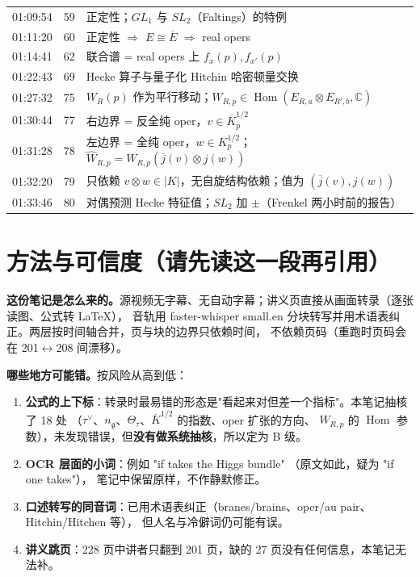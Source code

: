 \documentclass[11pt,a4paper]{ctexart}
\newcommand{\Hom}{\operatorname{Hom}}
\begin{document}
\begin{center}
\begin{tabular}{@{}llp{9.6cm}@{}}
01:09:54 & 59 & 正定性；$GL_1$ 与 $SL_2$（Faltings）的特例\\
01:11:20 & 60 & 正定性 $\Rightarrow$ $E\cong\overline{E}$ $\Rightarrow$ real opers\\
01:14:41 & 62 & 联合谱 = real opers 上 $f_x(p),f_{x'}(p)$\\
01:22:43 & 69 & Hecke 算子与量子化 Hitchin 哈密顿量交换\\
01:27:32 & 75 & $W_R(p)$ 作为平行移动；$W_{R,p}\in\Hom(E_{R,a}\otimes E_{R',b},\mathbb{C})$\\
01:30:44 & 77 & 右边界 = 反全纯 oper，$v\in\overline{K}^{1/2}_p$\\
01:31:28 & 78 & 左边界 = 全纯 oper，$w\in K^{1/2}_p$；$\widehat{W}_{R,p}=W_{R,p}(\overline{j}(v)\otimes j(w))$\\
01:32:20 & 79 & 只依赖 $v\otimes w\in|K|$，无自旋结构依赖；值为 $(\overline{j}(v),j(w))$\\
01:33:46 & 80 & 对偶预测 Hecke 特征值；$SL_2$ 加 $\pm$（Frenkel 两小时前的报告）\\
\bottomrule
\end{tabular}
\end{center}

\section{方法与可信度（请先读这一段再引用）}

\textbf{这份笔记是怎么来的。}源视频无字幕、无自动字幕；讲义页直接从画面转录（逐张读图、公式转 LaTeX），
音轨用 faster-whisper small.en 分块转写并用术语表纠正。两层按时间轴合并，页与块的边界只依赖时间，
不依赖页码（重跑时页码会在 201$\leftrightarrow$208 间漂移）。

\textbf{哪些地方可能错。}按风险从高到低：
\begin{enumerate}[label=\arabic*.]
\item \textbf{公式的上下标}：转录时最易错的形态是"看起来对但差一个指标"。本笔记抽核了 18 处
（$\tau^{\vee}$、$n_{\mathfrak{g}}$、$\Theta_\tau$、$\overline{K}^{1/2}$ 的指数、oper 扩张的方向、
$W_{R,p}$ 的 $\Hom$ 参数），未发现错误，但\textbf{没有做系统抽核}，所以定为 B 级。
\item \textbf{OCR 层面的小词}：例如 "if takes the Higgs bundle" （原文如此，疑为 "if one takes"），
笔记中保留原样，不作静默修正。
\item \textbf{口述转写的同音词}：已用术语表纠正（branes/brains、oper/au pair、Hitchin/Hitchen 等），
但人名与冷僻词仍可能有误。
\item \textbf{讲义跳页}：228 页中讲者只翻到 201 页，缺的 27 页没有任何信息，本笔记无法补。
\end{enumerate}
\end{document}
